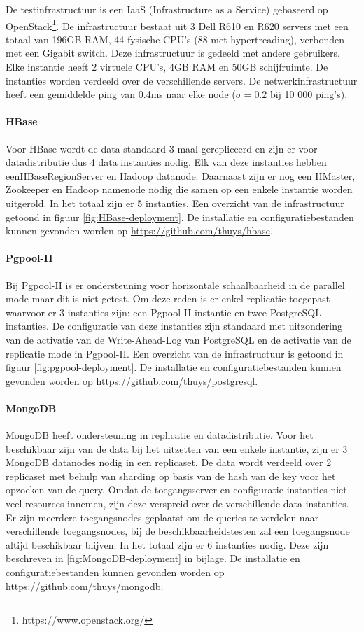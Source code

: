 De testinfrastructuur is een IaaS (Infrastructure as a Service) gebaseerd op OpenStack\footnote{https://www.openstack.org/}. De infrastructuur bestaat uit 3 Dell R610 en R620 servers met een totaal van 196GB RAM, 44 fysische CPU's (88 met hypertreading), verbonden met een Gigabit switch. Deze infrastructuur is gedeeld met andere gebruikers. Elke instantie heeft 2 virtuele CPU's, 4GB RAM en 50GB schijfruimte. De instanties worden verdeeld over de verschillende servers. De netwerkinfrastructuur heeft een gemiddelde ping van 0.4ms naar elke node ($\sigma = 0.2$ bij 10 000 ping's). 

\paragraph{HBase} Voor HBase wordt de data standaard 3 maal gerepliceerd en zijn er voor datadistributie dus 4 data instanties nodig. Elk van deze instanties hebben eenHBaseRegionServer en Hadoop datanode. Daarnaast zijn er nog een HMaster, Zookeeper en Hadoop namenode nodig die samen op een enkele instantie worden uitgerold. In het totaal zijn er 5 instanties. Een overzicht van de infrastructuur getoond in figuur \ref{fig:HBase-deployment}. De installatie en configuratiebestanden kunnen gevonden worden op \url{https://github.com/thuys/hbase}. 

\paragraph{Pgpool-II} Bij Pgpool-II is er ondersteuning voor horizontale schaalbaarheid in de parallel mode maar dit is niet getest. Om deze reden is er enkel replicatie toegepast waarvoor er 3 instanties zijn: een Pgpool-II instantie en twee PostgreSQL instanties. De configuratie van deze instanties zijn standaard met uitzondering van de activatie van de Write-Ahead-Log van PostgreSQL en de activatie van de replicatie mode in Pgpool-II. Een overzicht van de infrastructuur is getoond in figuur \ref{fig:pgpool-deployment}. De installatie en configuratiebestanden kunnen gevonden worden op \url{https://github.com/thuys/postgresql}.

\paragraph{MongoDB} MongoDB heeft ondersteuning in replicatie en datadistributie. Voor het beschikbaar zijn van de data bij het uitzetten van een enkele instantie, zijn er 3 MongoDB datanodes nodig in een replicaset. De data wordt verdeeld over 2 replicaset met behulp van sharding op basis van de hash van de key voor het opzoeken van de query. Omdat de toegangsserver en configuratie instanties niet veel resources innemen, zijn deze verspreid over de verschillende data instanties. Er zijn meerdere toegangsnodes geplaatst om de queries te verdelen naar verschillende toegangsnodes, bij de beschikbaarheidstesten zal een toegangsnode altijd beschikbaar blijven. In het totaal zijn er 6 instanties nodig. Deze zijn beschreven in \ref{fig:MongoDB-deployment} in bijlage. De installatie en configuratiebestanden kunnen gevonden worden op \url{https://github.com/thuys/mongodb}.


